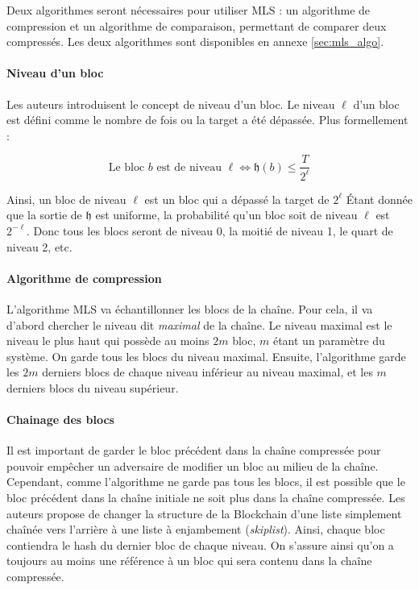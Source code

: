     Deux algorithmes seront nécessaires pour utiliser MLS : un algorithme de
    compression et un algorithme de comparaison, permettant de comparer deux
    compressés. Les deux algorithmes sont disponibles en annexe
    \ref{sec:mls_algo}.

    \paragraph{Niveau d'un bloc} Les auteurs introduisent le concept de niveau
    d'un bloc. Le niveau $\ell$ d'un bloc est défini comme le nombre de fois
    ou la target a été dépassée. Plus formellement :

    \begin{equation}
        \textrm{Le bloc } b \textrm{ est de niveau } \ell \Leftrightarrow
        \mathfrak{h}(b) \leq \frac{T}{2^\ell}
    \end{equation}

    Ainsi, un bloc de niveau $\ell$ est un bloc qui a dépassé la target de
    $2^\ell$ Étant donnée que la sortie de $\mathfrak{h}$ est uniforme, la
    probabilité qu'un bloc soit de niveau $\ell$ est $2^{-\ell}$. Donc tous les
    blocs seront de niveau 0, la moitié de niveau 1, le quart de niveau 2, etc.

    \paragraph{Algorithme de compression} L'algorithme MLS va échantillonner les
    blocs de la chaîne. Pour cela, il va d'abord chercher le niveau dit
    \textit{maximal} de la chaîne. Le niveau maximal est le niveau le plus haut
    qui possède au moins $2m$ bloc, $m$ étant un paramètre du système. On garde
    tous les blocs du niveau maximal. Ensuite, l'algorithme garde les $2m$
    derniers blocs de chaque niveau inférieur au niveau maximal, et les $m$
    derniers blocs du niveau supérieur.


    \paragraph{Chainage des blocs} Il est important de garder le bloc précédent
    dans la chaîne compressée pour pouvoir empêcher un adversaire de modifier un
    bloc au milieu de la chaîne. Cependant, comme l'algorithme ne garde pas tous
    les blocs, il est possible que le bloc précédent dans la chaîne initiale ne
    soit plus dans la chaîne compressée. Les auteurs propose de changer la
    structure de la Blockchain d'une liste simplement chaînée vers l'arrière à
    une liste à enjambement (\emph{skiplist}). Ainsi, chaque bloc contiendra le
    hash du dernier bloc de chaque niveau. On s'assure ainsi qu'on a toujours au
    moins une référence à un bloc qui sera contenu dans la chaîne compressée.

